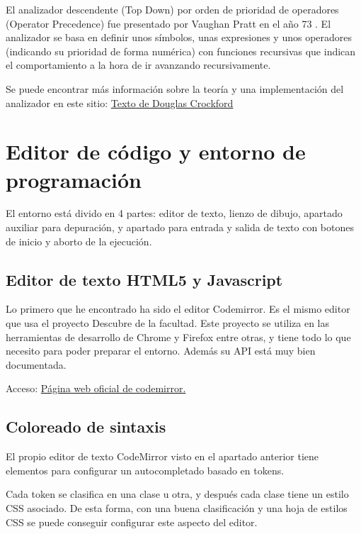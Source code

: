 \documentclass{report}
\begin{document}
	El analizador descendente (Top Down) por orden de prioridad de operadores (Operator Precedence) fue presentado por Vaughan Pratt en el año 73 \cite{acmtdop}. El analizador se basa en definir unos símbolos, unas expresiones y unos operadores (indicando su prioridad de forma numérica) con funciones recursivas que indican el comportamiento a la hora de ir avanzando recursivamente.
	
	Se puede encontrar más información sobre la teoría y una implementación del analizador en este sitio: 
	\href{http://javascript.crockford.com/tdop/tdop.html}{Texto de Douglas Crockford}
		
	\section{Editor de código y entorno de programación}
	
	El entorno está divido en 4 partes: editor de texto, lienzo de dibujo, apartado auxiliar para depuración, y apartado para entrada y salida de texto con botones de inicio y aborto de la ejecución.
	
	\subsection{Editor de texto HTML5 y Javascript}
	
	Lo primero que he encontrado ha sido el editor Codemirror. Es el mismo editor que usa el proyecto Descubre de la facultad. Este proyecto se utiliza en las herramientas de desarrollo de Chrome y Firefox entre otras, y tiene
	todo lo que necesito para poder preparar el entorno. Además su API está muy bien documentada\cite{codemirrorapi}.
	
	Acceso:
	\href{http://codemirror.net/}{Página web oficial de codemirror.}
	
	\subsection{Coloreado de sintaxis}
	
	El propio editor de texto CodeMirror visto en el apartado anterior tiene elementos para configurar un autocompletado basado en tokens. 
	
	\vspace{10px}
	
	Cada token se clasifica en una clase u otra, y después cada clase tiene un estilo CSS asociado. De esta forma, con una buena clasificación y una hoja de estilos CSS se puede conseguir configurar este aspecto del editor.
	
\end{document}
